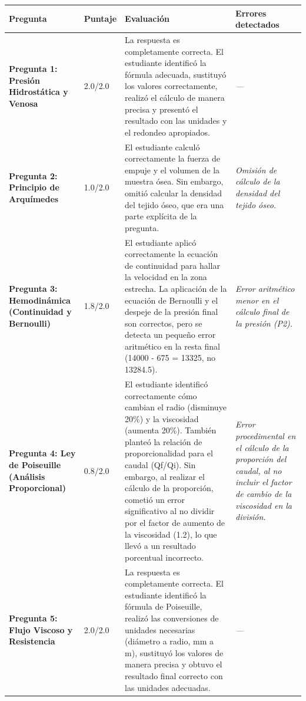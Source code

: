 \documentclass[11pt,a4paper]{article}
\begin{document}
\begin{longtable}{>{\bfseries}p{2.8cm} p{1.6cm} p{7.0cm} p{2.8cm}}
  \toprule
  \textbf{Pregunta} & \textbf{Puntaje} & \textbf{Evaluación} & \textbf{Errores detectados} \\
  \midrule
  \endhead
  \bottomrule
  \endfoot
    \textbf{Pregunta 1: Presión Hidrostática y Venosa} & 2.0/2.0 & La respuesta es completamente correcta. El estudiante identificó la fórmula adecuada, sustituyó los valores correctamente, realizó el cálculo de manera precisa y presentó el resultado con las unidades y el redondeo apropiados. & \textit{---} \\
    \midrule
    \textbf{Pregunta 2: Principio de Arquímedes} & 1.0/2.0 & El estudiante calculó correctamente la fuerza de empuje y el volumen de la muestra ósea. Sin embargo, omitió calcular la densidad del tejido óseo, que era una parte explícita de la pregunta. & \textit{Omisión de cálculo de la densidad del tejido óseo.} \\
    \midrule
    \textbf{Pregunta 3: Hemodinámica (Continuidad y Bernoulli)} & 1.8/2.0 & El estudiante aplicó correctamente la ecuación de continuidad para hallar la velocidad en la zona estrecha. La aplicación de la ecuación de Bernoulli y el despeje de la presión final son correctos, pero se detecta un pequeño error aritmético en la resta final (14000 - 675 = 13325, no 13284.5). & \textit{Error aritmético menor en el cálculo final de la presión (P2).} \\
    \midrule
    \textbf{Pregunta 4: Ley de Poiseuille (Análisis Proporcional)} & 0.8/2.0 & El estudiante identificó correctamente cómo cambian el radio (disminuye 20\%) y la viscosidad (aumenta 20\%). También planteó la relación de proporcionalidad para el caudal (Qf/Qi). Sin embargo, al realizar el cálculo de la proporción, cometió un error significativo al no dividir por el factor de aumento de la viscosidad (1.2), lo que llevó a un resultado porcentual incorrecto. & \textit{Error procedimental en el cálculo de la proporción del caudal, al no incluir el factor de cambio de la viscosidad en la división.} \\
    \midrule
    \textbf{Pregunta 5: Flujo Viscoso y Resistencia} & 2.0/2.0 & La respuesta es completamente correcta. El estudiante identificó la fórmula de Poiseuille, realizó las conversiones de unidades necesarias (diámetro a radio, mm a m), sustituyó los valores de manera precisa y obtuvo el resultado final correcto con las unidades adecuadas. & \textit{---} \\
    \midrule
\end{longtable}
\end{document}
